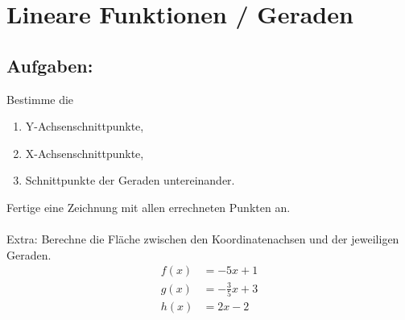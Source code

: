 



\section*{Lineare Funktionen / Geraden}
\subsection*{Aufgaben:}
Bestimme die
\begin{enumerate}
      \item Y-Achsenschnittpunkte,
      \item X-Achsenschnittpunkte,
      \item Schnittpunkte der Geraden untereinander.
\end{enumerate}
Fertige eine Zeichnung mit allen errechneten Punkten an.\\\\
Extra: Berechne die Fläche zwischen den Koordinatenachsen und der jeweiligen Geraden.
\begin{align}
    f(x) &= -5x+1 \\
    g(x) &= -\frac{3}{5}x+3 \\
    h(x) &= 2x-2
\end{align}


